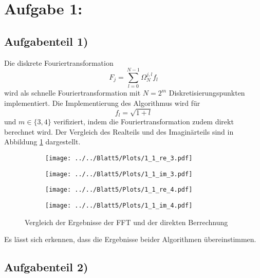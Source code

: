 \section*{Aufgabe 1: }
\subsection*{Aufgabenteil 1)}
Die diskrete Fouriertransformation
\begin{equation}
  F_j=\sum_{l=0}^{N-1}\Omega_N^{j,l}f_l
\end{equation}
wird als schnelle Fouriertransformation mit $N=2^m$ Diskretisierungspunkten implementiert. Die Implementierung
des Algorithmus wird für
\begin{equation}
  f_l=\sqrt{1+l}
\end{equation}
und $m\in\{3,4\}$ verifiziert, indem die Fouriertransformation zudem direkt berechnet wird. Der Vergleich des Realteils und des Imaginärteils sind in Abbildung \ref{fig:plot1} dargestellt.
\begin{figure}[h]
\begin{subfigure}[c]{0.5\textwidth}
\texttt{[image: ../../Blatt5/Plots/1\_1\_re\_3.pdf]}
\end{subfigure}
\begin{subfigure}[c]{0.5\textwidth}
\texttt{[image: ../../Blatt5/Plots/1\_1\_im\_3.pdf]}
\end{subfigure}
\begin{subfigure}[c]{0.5\textwidth}
\texttt{[image: ../../Blatt5/Plots/1\_1\_re\_4.pdf]}
\end{subfigure}
\begin{subfigure}[c]{0.5\textwidth}
\texttt{[image: ../../Blatt5/Plots/1\_1\_im\_4.pdf]}
\end{subfigure}
\caption{Vergleich der Ergebnisse der FFT und der direkten Berrechnung}
\label{fig:plot1}
\end{figure}
Es lässt sich erkennen, dass die Ergebnisse beider Algorithmen übereinstimmen.

\subsection*{Aufgabenteil 2)}

